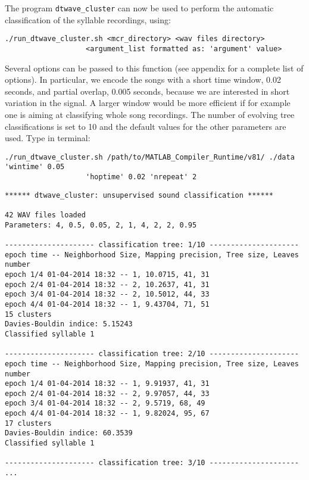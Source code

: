 \documentclass[a4paper]{article}
\begin{document}
The program \texttt{dtwave\_cluster} can now be used to perform the automatic classification of the syllable recordings, using:\\
\begin{verbatim}
./run_dtwave_cluster.sh <mcr_directory> <wav files directory> 
                   <argument_list formatted as: 'argument' value>
\end{verbatim}

Several options can be passed to this function (see appendix for a complete list of options).
In particular, we encode the songs with a short time window, 0.02 seconds, and partial overlap, 0.005 seconds, because we are interested in short variation in the signal.
A larger window would be more efficient if for example one is aiming at classifying whole song recordings.
The number of evolving tree classifications is set to 10 and the default values for the other parameters are used.
Type in terminal:

\begin{verbatim}
./run_dtwave_cluster.sh /path/to/MATLAB_Compiler_Runtime/v81/ ./data 'wintime' 0.05 
                   'hoptime' 0.02 'nrepeat' 2
\end{verbatim}

\color{lightgray}
\begin{verbatim}
****** dtwave_cluster: unsupervised sound classification ******

42 WAV files loaded
Parameters: 4, 0.5, 0.05, 2, 1, 4, 2, 2, 0.95

--------------------- classification tree: 1/10 ---------------------
epoch time -- Neighborhood Size, Mapping precision, Tree size, Leaves number
epoch 1/4 01-04-2014 18:32 -- 1, 10.0715, 41, 31
epoch 2/4 01-04-2014 18:32 -- 2, 10.2637, 41, 31
epoch 3/4 01-04-2014 18:32 -- 2, 10.5012, 44, 33
epoch 4/4 01-04-2014 18:32 -- 1, 9.43704, 71, 51
15 clusters
Davies-Bouldin indice: 5.15243
Classified syllable 1

--------------------- classification tree: 2/10 ---------------------
epoch time -- Neighborhood Size, Mapping precision, Tree size, Leaves number
epoch 1/4 01-04-2014 18:32 -- 1, 9.91937, 41, 31
epoch 2/4 01-04-2014 18:32 -- 2, 9.97057, 44, 33
epoch 3/4 01-04-2014 18:32 -- 2, 9.5719, 68, 49
epoch 4/4 01-04-2014 18:32 -- 1, 9.82024, 95, 67
17 clusters
Davies-Bouldin indice: 60.3539
Classified syllable 1

--------------------- classification tree: 3/10 ---------------------
...
\end{verbatim}
\color{black}
\end{document}
